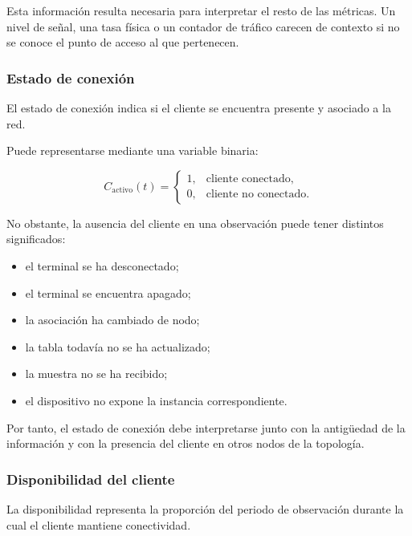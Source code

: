 Esta información resulta necesaria para interpretar el resto de las
métricas. Un nivel de señal, una tasa física o un contador de tráfico
carecen de contexto si no se conoce el punto de acceso al que pertenecen.


\subsubsection*{Estado de conexión}

El estado de conexión indica si el cliente se encuentra presente y
asociado a la red.

Puede representarse mediante una variable binaria:

\[
    C_{\mathrm{activo}}(t)
    =
    \begin{cases}
        1, & \text{cliente conectado},\\
        0, & \text{cliente no conectado}.
    \end{cases}
\]

No obstante, la ausencia del cliente en una observación puede tener
distintos significados:

\begin{itemize}
    \item el terminal se ha desconectado;

    \item el terminal se encuentra apagado;

    \item la asociación ha cambiado de nodo;

    \item la tabla todavía no se ha actualizado;

    \item la muestra no se ha recibido;

    \item el dispositivo no expone la instancia correspondiente.
\end{itemize}

Por tanto, el estado de conexión debe interpretarse junto con la
antigüedad de la información y con la presencia del cliente en otros
nodos de la topología.


\subsubsection*{Disponibilidad del cliente}

La disponibilidad representa la proporción del periodo de observación
durante la cual el cliente mantiene conectividad.

